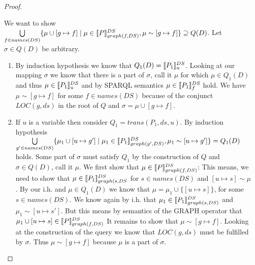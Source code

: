 \begin{proof}
\begin{enumerate}
			We want to show 
			$\bigcup\limits_{f \in names(DS)}\{ \mu \cup [g \mapsto f] \mid \mu \in
				\llbracket P\rrbracket^{DS}_{graph(f,DS)} , \mu \sim
			[g\mapsto f] \} \supseteq Q(D)$.
			Let $\sigma \in Q(D)$ be arbitrary.
			\begin{enumerate}
				\item 					By induction hypothesis we know that 
					$Q_1(D) = \llbracket P_1\rrbracket^{DS}_{u}$. Looking at our mapping
					$\sigma$ we know that there is a part of $\sigma$, call it $\mu$
					for which $\mu \in Q_1(D)$ and thus $\mu \in \llbracket P_1
					\rrbracket^{DS}_{u}$ and  by SPARQL semantics $\mu \in \llbracket P_1
					\rrbracket^{DS}_{f}$ hold. 
					We have $\mu \sim [g \mapsto f]$ for some 
					$f \in names(DS)$ because of the
					conjunct $LOC(g,ds)$ in the root of $Q$ and $\sigma = \mu \cup [g \mapsto f]$.
				\item If $u$ is a variable then	consider $Q_1 = trans(P_1,ds,
					u)$. By induction hypothesis
					$\bigcup\limits_{g'\in names(DS)} \{ \mu_1 \cup [u\mapsto g'] \mid
						\mu_1 \in \llbracket P_1 \rrbracket^{DS}_{graph(g',DS)}, \mu_1 \sim [u
					\mapsto g']\} = Q_1(D)$ holds. 
					Some part of $\sigma$ must satisfy $Q_1$ by the construction of
					$Q$ and $\sigma \in Q(D)$, call it $\mu$.
					We first show that $\mu \in \llbracket P\rrbracket^{DS}_{graph(f,DS)}$:
					This means, we need to show that $\mu \in \llbracket P_1
					\rrbracket^{DS}_{graph(s,DS}$ for $s \in names(DS)$ and $[u \mapsto s]
					\sim \mu$.
					By our i.h. and $\mu \in Q_1(D)$ we know that
					$\mu = \mu_1 \cup \{[u \mapsto s] \}$, for some $s \in
					names(DS)$. We know again by i.h. that $\mu_1 \in \llbracket P_1
					\rrbracket^{DS}_{graph(s,DS)}$ and $\mu_1 \sim [u\mapsto s']$.
					But this means by semantics of the GRAPH operator that $\mu_1
					\cup [u \mapsto s] \in \llbracket P
					\rrbracket^{DS}_{graph(f,DS)}$ It remains to show that $\mu \sim
					[g \mapsto f]$. Looking at the construction of the query we know
					that $LOC(g,ds)$ must be fulfilled by $\sigma$. 
					Thus $\mu \sim [g\mapsto f]$
					because $\mu$ is a part of $\sigma$.
			\end{enumerate}


\end{enumerate}
\end{proof}
